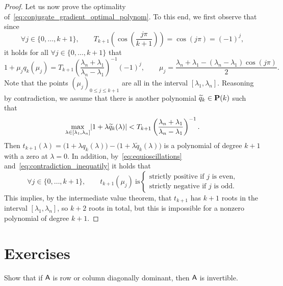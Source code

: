 \begin{proof}
Let us now prove the optimality of~\eqref{eq:conjugate_gradient_optimal_polynom}.
To this end, we first observe that since
\[
    \forall j \in \{0, \dotsc, k+1\}, \qquad
    T_{k+1} \left( \cos\left( \frac{j \pi}{k+1} \right) \right) = \cos \left( j \pi \right) = (-1)^j,
\]
it holds for all $\forall j \in \{0, \dotsc, k+1\}$ that
\begin{equation}
    \label{eq:equioscillations}
    1 + \mu_j q_k(\mu_j) = T_{k+1}\left(\frac{\lambda_n + \lambda_1}{\lambda_n - \lambda_1}\right) ^{-1} (-1)^j,
    \qquad \mu_j = \frac{\lambda_n + \lambda_1 - (\lambda_n - \lambda_1) \cos \left( j \pi \right)}{2}.
\end{equation}
Note that the points $(\mu_j)_{0 \leq j \leq k+1}$ are all in the interval $[\lambda_1, \lambda_n]$.
Reasoning by contradiction,
we assume that there is another polynomial $\widetilde q_k \in \mathbf P(k)$ such that
\begin{equation}
    \label{eq:contradiction_inequatily}
    \max_{\lambda \in [\lambda_1, \lambda_n]} \lvert1 + \lambda \widetilde q_k(\lambda)\rvert
    <  T_{k+1}\left(\frac{\lambda_n + \lambda_1}{\lambda_n - \lambda_1}\right) ^{-1}.
\end{equation}
Then $t_{k+1}(\lambda) = \bigl(1 + \lambda q_k(\lambda)\bigr) - \bigl(1 + \lambda \widetilde q_k(\lambda)\bigr)$ is a polynomial of degree $k+1$
with a zero at $\lambda = 0$.
In addition,
by~\eqref{eq:equioscillations} and~\eqref{eq:contradiction_inequatily} it holds that
\[
    \forall j \in \{0, \dotsc, k+1\}, \qquad
    t_{k+1}(\mu_j)~\text{is}
    \begin{cases}
        \text{strictly positive if $j$ is even,} \\
        \text{strictly negative if $j$ is odd.}
    \end{cases}
\]
This implies, by the intermediate value theorem,
that $t_{k+1}$ has $k+1$ roots in the interval $[\lambda_1, \lambda_n]$,
so $k+2$ roots in total,
but this is impossible for a nonzero polynomial of degree $k+1$.
\end{proof}

\section{Exercises}%
\begin{exercise}
    \label{exercise:invertibility_diagonal_dominant}
    Show that if $\mathsf A$ is row or column diagonally dominant,
    then $\mathsf A$ is invertible.
\end{exercise}


